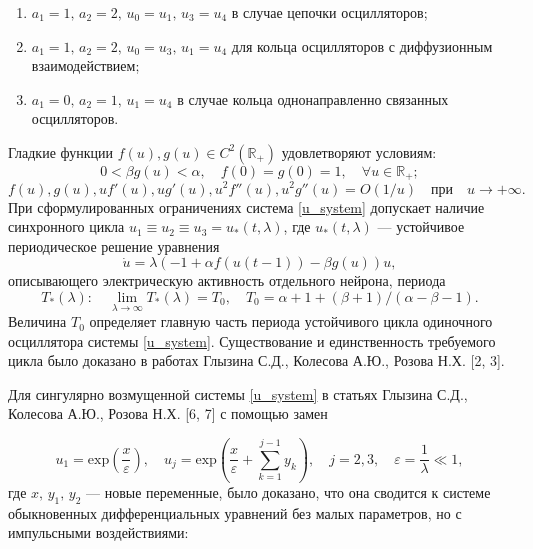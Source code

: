 \documentclass[12pt]{extarticle}
\begin{document}
\begin{enumerate}[label=\arabic*),leftmargin=1.5\parindent]

\item $ a_1 = 1, \, a_2 = 2, \, u_0 = u_1, \, u_3 = u_4 $ в случае цепочки осцилляторов;
\item $ a_1 = 1, \, a_2 = 2, \, u_0 = u_3, \, u_1 = u_4 $ для кольца осцилляторов с диффузионным взаимодействием;
\item $ a_1 = 0, \, a_2 = 1, \, u_1 = u_4 $ в случае кольца однонаправленно связанных осцилляторов.

\end{enumerate}
Гладкие функции $ f(u), g(u) \in C^2(\mathbb{R}_+) $ удовлетворяют условиям:
$$ 0 < \beta g(u) < \alpha, \quad f(0) = g(0) = 1, \quad \forall u \in \mathbb{R}_+; $$
$$ f(u), g(u), uf'(u), ug'(u), u^2f''(u), u^2g''(u) = O(1/u) \quad \text{при} \quad u \to +\infty. $$
При сформулированных ограничениях система \eqref{u_system} допускает наличие синхронного цикла $ u_1 \equiv u_2 \equiv  u_3 = u_*(t, \lambda) $, где $ u_*(t, \lambda) $ --- устойчивое периодическое решение уравнения
\begin{equation}\label{sing_neuron}
	\dot{u} = \lambda(-1+\alpha f(u(t-1)) - \beta g(u))u,
\end{equation}
описывающего электрическую активность отдельного нейрона, периода
$$ T_*(\lambda): \quad \lim_{\lambda\to\infty} T_*(\lambda) = T_0, \quad T_0 = \alpha + 1 + (\beta+1)/(\alpha - \beta - 1). $$
Величина $ T_0 $ определяет главную часть периода устойчивого цикла одиночного осциллятора системы \eqref{u_system}. Существование и единственность требуемого цикла было доказано в работах Глызина С.Д., Колесова А.Ю., Розова Н.Х. [2, 3].

Для сингулярно возмущенной системы \eqref{u_system} в статьях Глызина С.Д., Колесова А.Ю., Розова Н.Х. [6, 7] с помощью замен

$$ u_1 = \mbox{exp}\left(\frac{x}{\varepsilon}\right), \quad u_j = \mbox{exp}\left(\frac{x}{\varepsilon} + \sum_{k=1}^{j-1}y_k\right), \quad j= 2,3, \quad \varepsilon = \frac{1}{\lambda}\ll 1, $$
где $ x, \, y_1, \, y_2 $ --- новые переменные, было доказано, что она сводится к системе обыкновенных дифференциальных уравнений без малых параметров, но с импульсными воздействиями:
\end{document}
